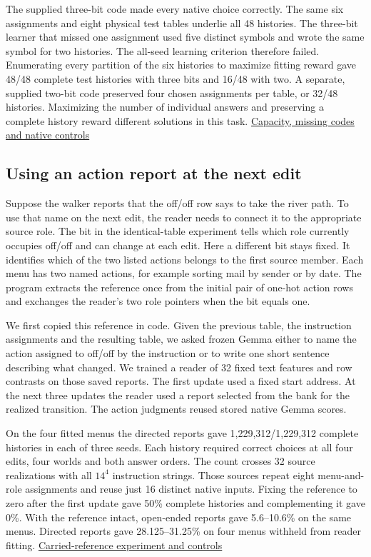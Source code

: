 \documentclass[11pt]{article}
\begin{document}
The supplied three-bit code made every native choice correctly. The same six assignments and eight physical test tables underlie all 48 histories. The three-bit learner that missed one assignment used five distinct symbols and wrote the same symbol for two histories. The all-seed learning criterion therefore failed. Enumerating every partition of the six histories to maximize fitting reward gave 48/48 complete test histories with three bits and 16/48 with two. A separate, supplied two-bit code preserved four chosen assignments per table, or 32/48 histories. Maximizing the number of individual answers and preserving a complete history reward different solutions in this task. \href{https://github.com/RyoSpiralArchitect/self-fold/blob/v1.0.0/provenance/preprint_v1_20261104/RESULTS.md#six-histories-through-a-discrete-message}{Capacity, missing codes and native controls}

\subsection{Using an action report at the next edit}

Suppose the walker reports that the off/off row says to take the river path. To use that name on the next edit, the reader needs to connect it to the appropriate source role. The bit in the identical-table experiment tells which role currently occupies off/off and can change at each edit. Here a different bit stays fixed. It identifies which of the two listed actions belongs to the first source member. Each menu has two named actions, for example sorting mail by sender or by date. The program extracts the reference once from the initial pair of one-hot action rows and exchanges the reader's two role pointers when the bit equals one.

We first copied this reference in code. Given the previous table, the instruction assignments and the resulting table, we asked frozen Gemma either to name the action assigned to off/off by the instruction or to write one short sentence describing what changed. We trained a reader of 32 fixed text features and row contrasts on those saved reports. The first update used a fixed start address. At the next three updates the reader used a report selected from the bank for the realized transition. The action judgments reused stored native Gemma scores.

On the four fitted menus the directed reports gave 1,229,312/1,229,312 complete histories in each of three seeds. Each history required correct choices at all four edits, four worlds and both answer orders. The count crosses 32 source realizations with all $14^4$ instruction strings. Those sources repeat eight menu-and-role assignments and reuse just 16 distinct native inputs. Fixing the reference to zero after the first update gave 50\% complete histories and complementing it gave 0\%. With the reference intact, open-ended reports gave 5.6--10.6\% on the same menus. Directed reports gave 28.125--31.25\% on four menus withheld from reader fitting. \href{https://github.com/RyoSpiralArchitect/self-fold/blob/896d051372f61a5d1796590fcf0e6322475bba74/provenance/message_boundary_20261106/write9/RESULTS.md}{Carried-reference experiment and controls}
\end{document}
